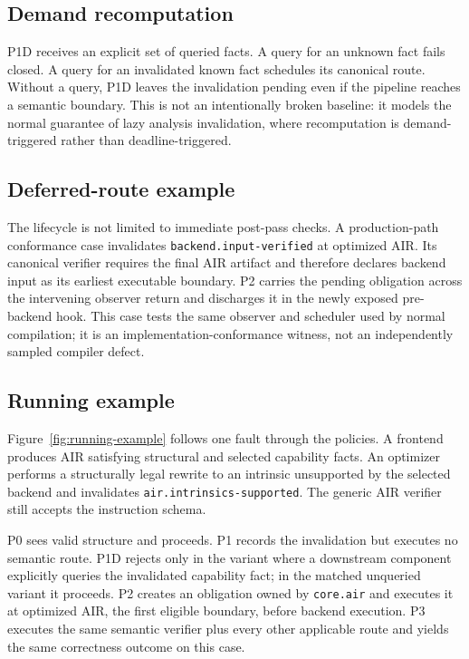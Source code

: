 \subsection{Demand recomputation}
P1D receives an explicit set of queried facts. A query for an unknown fact fails closed. A query for an invalidated known fact schedules its canonical route. Without a query, P1D leaves the invalidation pending even if the pipeline reaches a semantic boundary. This is not an intentionally broken baseline: it models the normal guarantee of lazy analysis invalidation, where recomputation is demand-triggered rather than deadline-triggered.

\subsection{Deferred-route example}
The lifecycle is not limited to immediate post-pass checks. A production-path conformance case invalidates \texttt{backend.input-verified} at optimized AIR. Its canonical verifier requires the final AIR artifact and therefore declares backend input as its earliest executable boundary. P2 carries the pending obligation across the intervening observer return and discharges it in the newly exposed pre-backend hook. This case tests the same observer and scheduler used by normal compilation; it is an implementation-conformance witness, not an independently sampled compiler defect.

\subsection{Running example}
Figure~\ref{fig:running-example} follows one fault through the policies. A frontend produces AIR satisfying structural and selected capability facts. An optimizer performs a structurally legal rewrite to an intrinsic unsupported by the selected backend and invalidates \texttt{air.intrinsics-supported}. The generic AIR verifier still accepts the instruction schema.

P0 sees valid structure and proceeds. P1 records the invalidation but executes no semantic route. P1D rejects only in the variant where a downstream component explicitly queries the invalidated capability fact; in the matched unqueried variant it proceeds. P2 creates an obligation owned by \texttt{core.air} and executes it at optimized AIR, the first eligible boundary, before backend execution. P3 executes the same semantic verifier plus every other applicable route and yields the same correctness outcome on this case.

